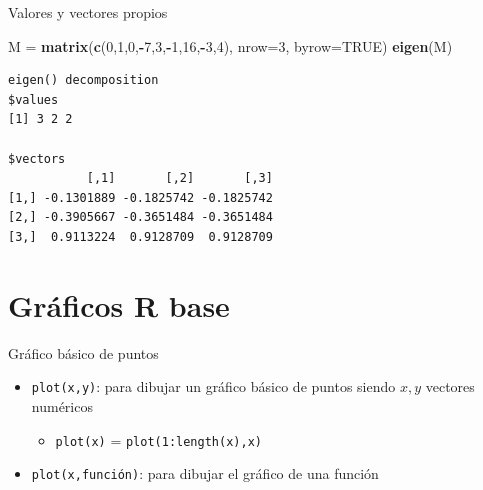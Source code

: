 \documentclass[
  ignorenonframetext,
]{beamer}
\newenvironment{Shaded}{\begin{snugshade}}{\end{snugshade}}
\newcommand{\AttributeTok}[1]{\textcolor[rgb]{0.13,0.29,0.53}{#1}}
\newcommand{\ConstantTok}[1]{\textcolor[rgb]{0.56,0.35,0.01}{#1}}
\newcommand{\DecValTok}[1]{\textcolor[rgb]{0.00,0.00,0.81}{#1}}
\newcommand{\FunctionTok}[1]{\textcolor[rgb]{0.13,0.29,0.53}{\textbf{#1}}}
\newcommand{\NormalTok}[1]{#1}
\newcommand{\OtherTok}[1]{\textcolor[rgb]{0.56,0.35,0.01}{#1}}
\newcommand{\SpecialCharTok}[1]{\textcolor[rgb]{0.81,0.36,0.00}{\textbf{#1}}}
\providecommand{\tightlist}{%
  \setlength{\itemsep}{0pt}\setlength{\parskip}{0pt}}
\begin{document}
\begin{frame}[fragile]{Valores y vectores propios}
\label{valores-y-vectores-propios-4}
\begin{Shaded}
\begin{Highlighting}[]
\NormalTok{M }\OtherTok{=} \FunctionTok{matrix}\NormalTok{(}\FunctionTok{c}\NormalTok{(}\DecValTok{0}\NormalTok{,}\DecValTok{1}\NormalTok{,}\DecValTok{0}\NormalTok{,}\SpecialCharTok{{-}}\DecValTok{7}\NormalTok{,}\DecValTok{3}\NormalTok{,}\SpecialCharTok{{-}}\DecValTok{1}\NormalTok{,}\DecValTok{16}\NormalTok{,}\SpecialCharTok{{-}}\DecValTok{3}\NormalTok{,}\DecValTok{4}\NormalTok{), }\AttributeTok{nrow=}\DecValTok{3}\NormalTok{, }\AttributeTok{byrow=}\ConstantTok{TRUE}\NormalTok{)}
\FunctionTok{eigen}\NormalTok{(M)}
\end{Highlighting}
\end{Shaded}

\begin{verbatim}
eigen() decomposition
$values
[1] 3 2 2

$vectors
           [,1]       [,2]       [,3]
[1,] -0.1301889 -0.1825742 -0.1825742
[2,] -0.3905667 -0.3651484 -0.3651484
[3,]  0.9113224  0.9128709  0.9128709
\end{verbatim}
\end{frame}

\section{Gráficos R base}\label{gruxe1ficos-r-base}

\begin{frame}[fragile]{Gráfico básico de puntos}
\label{gruxe1fico-buxe1sico-de-puntos}
\begin{itemize}
\tightlist
\item
  \texttt{plot(x,y)}: para dibujar un gráfico básico de puntos siendo
  \(x,y\) vectores numéricos

  \begin{itemize}
  \tightlist
  \item
    \texttt{plot(x)} = \texttt{plot(1:length(x),x)}
  \end{itemize}
\item
  \texttt{plot(x,función)}: para dibujar el gráfico de una función
\end{itemize}
\end{frame}
\end{document}
